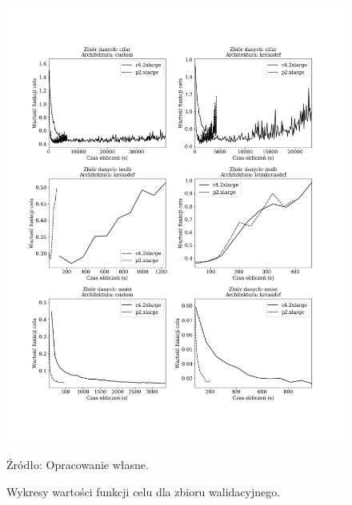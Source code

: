 \documentclass[12pt,a4paper,twoside]{article}
\newcommand{\source}[1]{\caption*{\hfill Źródło: {#1}} }
\begin{document}
\begin{figure}[h]
  \centering
\includegraphics[scale=0.5]{../obrazy/fig:experiment_loss_val.png}
\caption{Wykresy wartości funkcji celu dla zbioru walidacyjnego.\label{fig:experiment_loss_val}}
\source{Opracowanie własne.}
\end{figure}
\end{document}
